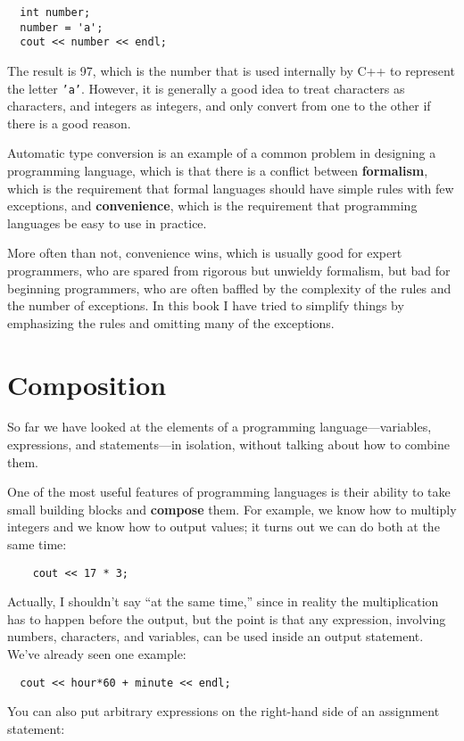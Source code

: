 \begin{verbatim}
  int number;
  number = 'a';
  cout << number << endl;
\end{verbatim}
%
The result is 97, which is the number that is used internally
by C++ to represent the letter {\tt 'a'}.  However, it is
generally a good idea to treat characters as characters, and
integers as integers, and only convert from one to the other
if there is a good reason.

Automatic type conversion is an example of a common problem in designing a
programming language, which is that there is a conflict between {\bf
formalism}, which is the requirement that formal languages should have
simple rules with few exceptions, and {\bf convenience}, which is the
requirement that programming languages be easy to use in practice.

More often than not, convenience wins, which is usually good for
expert programmers, who are spared from rigorous but unwieldy
formalism, but bad for beginning programmers, who are often baffled
by the complexity of the rules and the number of exceptions.  In this
book I have tried to simplify things by emphasizing the rules and
omitting many of the exceptions.


\section{Composition}

So far we have looked at the elements of a programming
language---variables, expressions, and statements---in
isolation, without talking about how to combine them.

One of the most useful features of programming languages
is their ability to take small building blocks and
{\bf compose} them.  For example, we know how to multiply
integers and we know how to output values; it turns out we can
do both at the same time:

\begin{verbatim}
    cout << 17 * 3;
\end{verbatim}
%
Actually, I shouldn't say ``at the same time,'' since in reality
the multiplication has to happen before the output, but
the point is that any expression, involving numbers, characters,
and variables, can be used inside an output statement.  We've
already seen one example:

\begin{verbatim}
  cout << hour*60 + minute << endl;
\end{verbatim}
%
You can also put arbitrary expressions on the right-hand
side of an assignment statement:

